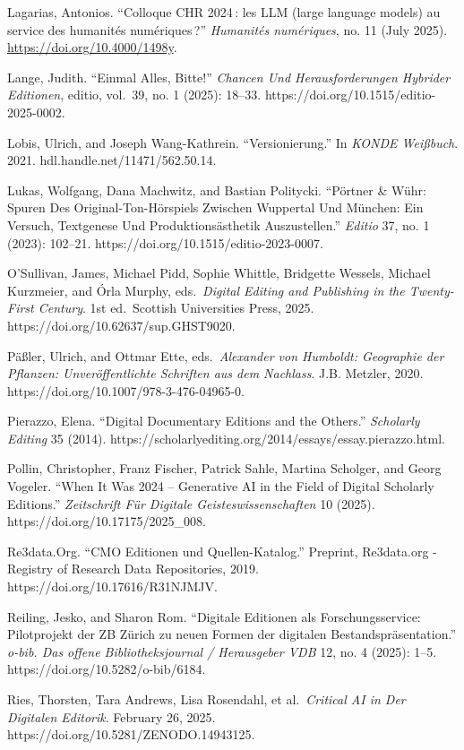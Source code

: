 \documentclass[
  letterpaper,
  DIV=11,
  numbers=noendperiod]{scrreprt}
\begin{document}
Lagarias, Antonios. ``Colloque CHR 2024\,: les LLM (large language
models) au service des humanités numériques\,?'' \emph{Humanités
numériques}, no. 11 (July 2025). \url{https://doi.org/10.4000/1498y}.

Lange, Judith. ``Einmal Alles, Bitte!'' \emph{Chancen Und
Herausforderungen Hybrider Editionen}, editio, vol.~39, no. 1 (2025):
18--33. https://doi.org/10.1515/editio-2025-0002.

Lobis, Ulrich, and Joseph Wang-Kathrein. ``Versionierung.'' In
\emph{KONDE Weißbuch}. 2021. hdl.handle.net/11471/562.50.14.

Lukas, Wolfgang, Dana Machwitz, and Bastian Politycki. ``Pörtner \&
Wühr: Spuren Des Original-Ton-Hörspiels Zwischen Wuppertal Und München:
Ein Versuch, Textgenese Und Produktionsästhetik Auszustellen.''
\emph{Editio} 37, no. 1 (2023): 102--21.
https://doi.org/10.1515/editio-2023-0007.

O'Sullivan, James, Michael Pidd, Sophie Whittle, Bridgette Wessels,
Michael Kurzmeier, and Órla Murphy, eds.~\emph{Digital Editing and
Publishing in the Twenty-First Century}. 1st ed.~Scottish Universities
Press, 2025. https://doi.org/10.62637/sup.GHST9020.

Päßler, Ulrich, and Ottmar Ette, eds.~\emph{Alexander von Humboldt:
Geographie der Pflanzen: Unveröffentlichte Schriften aus dem Nachlass}.
J.B. Metzler, 2020. https://doi.org/10.1007/978-3-476-04965-0.

Pierazzo, Elena. ``Digital Documentary Editions and the Others.''
\emph{Scholarly Editing} 35 (2014).
https://scholarlyediting.org/2014/essays/essay.pierazzo.html.

Pollin, Christopher, Franz Fischer, Patrick Sahle, Martina Scholger, and
Georg Vogeler. ``When It Was 2024 -- Generative AI in the Field of
Digital Scholarly Editions.'' \emph{Zeitschrift Für Digitale
Geisteswissenschaften} 10 (2025). https://doi.org/10.17175/2025\_008.

Re3data.Org. ``CMO Editionen und Quellen-Katalog.'' Preprint,
Re3data.org - Registry of Research Data Repositories, 2019.
https://doi.org/10.17616/R31NJMJV.

Reiling, Jesko, and Sharon Rom. ``Digitale Editionen als
Forschungsservice: Pilotprojekt der ZB Zürich zu neuen Formen der
digitalen Bestandspräsentation.'' \emph{o-bib. Das offene
Bibliotheksjournal / Herausgeber VDB} 12, no. 4 (2025): 1--5.
https://doi.org/10.5282/o-bib/6184.

Ries, Thorsten, Tara Andrews, Lisa Rosendahl, et al.~\emph{Critical AI
in Der Digitalen Editorik}. February 26, 2025.
https://doi.org/10.5281/ZENODO.14943125.
\end{document}
